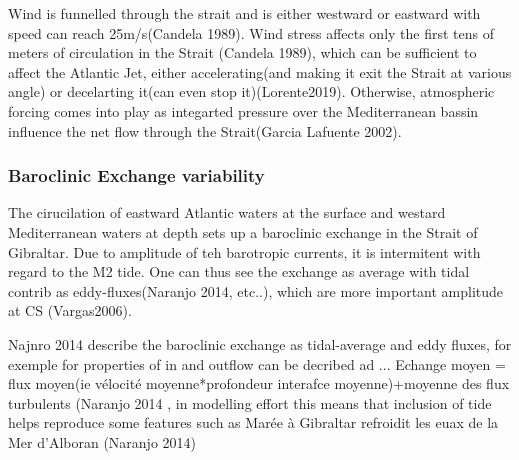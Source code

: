 


 Wind is funnelled through the strait and is either westward or eastward with speed can reach 25m/s(Candela 1989). Wind stress affects only the first tens of meters of circulation in the Strait (Candela 1989), which can be sufficient to affect the Atlantic Jet, either accelerating(and making it exit the Strait at various angle) or decelarting it(can even stop it)(Lorente2019). Otherwise, atmospheric forcing comes into play as integarted pressure over the Mediterranean bassin influence the net flow through the Strait(Garcia Lafuente 2002).






\subsubsection{Baroclinic Exchange variability}

The cirucilation of eastward Atlantic waters at the surface and westard Mediterranean waters at depth sets up a baroclinic exchange in the Strait of Gibraltar. Due to amplitude of teh barotropic currents, it is intermitent with regard to the M2 tide. One can thus see the exchange as average with tidal contrib as eddy-fluxes(Naranjo 2014, etc..), which are more important amplitude at CS (Vargas2006).  

Najnro 2014 describe the baroclinic exchange as tidal-average and eddy fluxes, for exemple for properties of in and outflow can be decribed ad ... 
Echange moyen = flux moyen(ie vélocité moyenne*profondeur interafce moyenne)+moyenne des flux turbulents (Naranjo 2014  , in modelling effort this means that inclusion of tide helps reproduce some features such as Marée à Gibraltar refroidit les euax de la Mer d’Alboran (Naranjo 2014)

